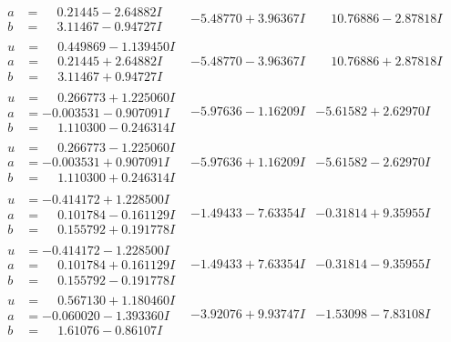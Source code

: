 \documentclass[1p]{elsarticle_modified}
\theoremstyle{definition}
\begin{document}
$$\begin{array}{c|c|c}
\begin{aligned}
a &= \phantom{-}0.21445 - 2.64882 I \\
b &= \phantom{-}3.11467 - 0.94727 I\end{aligned}
 & -5.48770 + 3.96367 I & \phantom{-}10.76886 - 2.87818 I \\ \hline\begin{aligned}
u &= \phantom{-}0.449869 - 1.139450 I \\
a &= \phantom{-}0.21445 + 2.64882 I \\
b &= \phantom{-}3.11467 + 0.94727 I\end{aligned}
 & -5.48770 - 3.96367 I & \phantom{-}10.76886 + 2.87818 I \\ \hline\begin{aligned}
u &= \phantom{-}0.266773 + 1.225060 I \\
a &= -0.003531 - 0.907091 I \\
b &= \phantom{-}1.110300 - 0.246314 I\end{aligned}
 & -5.97636 - 1.16209 I & -5.61582 + 2.62970 I \\ \hline\begin{aligned}
u &= \phantom{-}0.266773 - 1.225060 I \\
a &= -0.003531 + 0.907091 I \\
b &= \phantom{-}1.110300 + 0.246314 I\end{aligned}
 & -5.97636 + 1.16209 I & -5.61582 - 2.62970 I \\ \hline\begin{aligned}
u &= -0.414172 + 1.228500 I \\
a &= \phantom{-}0.101784 - 0.161129 I \\
b &= \phantom{-}0.155792 + 0.191778 I\end{aligned}
 & -1.49433 - 7.63354 I & -0.31814 + 9.35955 I \\ \hline\begin{aligned}
u &= -0.414172 - 1.228500 I \\
a &= \phantom{-}0.101784 + 0.161129 I \\
b &= \phantom{-}0.155792 - 0.191778 I\end{aligned}
 & -1.49433 + 7.63354 I & -0.31814 - 9.35955 I \\ \hline\begin{aligned}
u &= \phantom{-}0.567130 + 1.180460 I \\
a &= -0.060020 - 1.393360 I \\
b &= \phantom{-}1.61076 - 0.86107 I\end{aligned}
 & -3.92076 + 9.93747 I & -1.53098 - 7.83108 I \\ \hline\begin{aligned}

\end{aligned}
\end{array}$$
\end{document}
